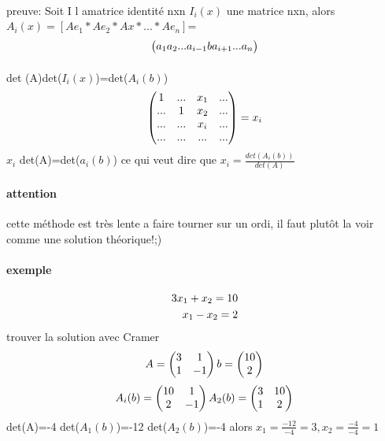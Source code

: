 \documentclass[a4paper,10pt]{article}
\begin{document}
\paragraph{}
preuve:
\newline
Soit I l amatrice identité nxn $I_i(x)$ une matrice nxn, alors $A_i(x)=[Ae_1*Ae_2*Ax*...*Ae_n]$=
\newline
\[
\begin{pmatrix}
a_1a_2...a_{i-1}ba_{i+1}...a_n\cr
\end{pmatrix}
\]
\paragraph{}
det (A)det($I_i(x)$)=det($A_i(b)$)
\newline
\[
\begin{pmatrix}
1&...&x_1&...\cr
...&1&x_2&...\cr
...&...&x_i&...\cr
...&...&...&...\cr
\end{pmatrix}
=x_i\]
\newline
$x_i$ det(A)=det($a_i(b)$) ce qui veut dire que $x_i=\frac{det(A_i(b))}{det(A)}$
\paragraph{attention}
cette méthode est très lente a faire tourner sur un ordi, il faut plutôt la voir comme une solution théorique!;)
\paragraph{exemple}
\begin{eqnarray}
 3x_1+x_2=10\cr
 x_1-x_2=2\cr
\end{eqnarray}
trouver la solution avec Cramer
\newline
\[
A=
\begin{pmatrix}
3&1\cr
1&-1\cr
\end{pmatrix}
b=
\begin{pmatrix}
10\cr
2\cr
\end{pmatrix}
\]
\newline
\[
A_i(b)=
\begin{pmatrix}
10&1\cr
2&-1\cr
\end{pmatrix}
A_2(b)=
\begin{pmatrix}
3&10\cr
1&2\cr
\end{pmatrix}
\]
\newline
det(A)=-4
\newline
det($A_1(b)$)=-12
\newline
det($A_2(b)$)=-4
\newline
alors $x_1=\frac{-12}{-4}=3,x_2=\frac{-4}{-4}=1$
\end{document}
